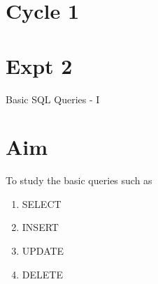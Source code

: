 \documentclass[13pt,oneside]{book}
\begin{document}
\section*{Cycle 1}
\section*{Expt 2}
\begin{center}
    \Large{Basic SQL Queries - I}
\end{center}

\section*{Aim}
\large{To study the basic queries such as
	\begin{enumerate}
		\item SELECT
		\item INSERT
		\item UPDATE
		\item DELETE
	\end{enumerate}
}
\end{document}
